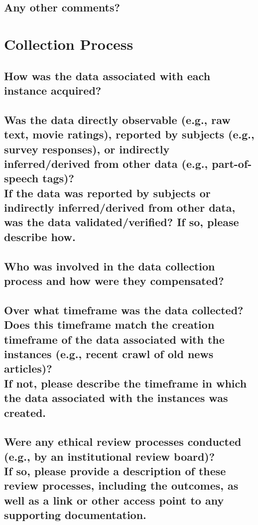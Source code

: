 \documentclass[letterpaper, 10 pt, conference]{ieeeconf}  %
\newcommand{\subtitle}[1]{{\\ \small \normalfont \color{purple} #1}}
\begin{document}
\lipsum[1]

\subsection{Any other comments?}

\lipsum[1]

\section{Collection Process}

\subsection{How was the data associated with each instance acquired?}

\lipsum[1]

\subsection{Was the data directly observable (e.g., raw text, movie ratings), reported by subjects (e.g., survey responses), or indirectly inferred/derived from other data (e.g., part-of-speech tags)? \subtitle{If the data was reported by subjects or indirectly inferred/derived from other data, was the data validated/verified? If so, please describe how.}}

\lipsum[1]

\subsection{Who was involved in the data collection process and how were they compensated?}

\lipsum[1]

\subsection{Over what timeframe was the data collected? Does this timeframe match the creation timeframe of the data associated with the instances (e.g., recent crawl of old news articles)? \subtitle{If not, please describe the timeframe in which the data associated with the instances was created.}}

\lipsum[1]

\subsection{Were any ethical review processes conducted (e.g., by an institutional review board)? \subtitle{If so, please provide a description of these review processes, including the outcomes, as well as a link or other access point to any supporting documentation.}}
\end{document}
